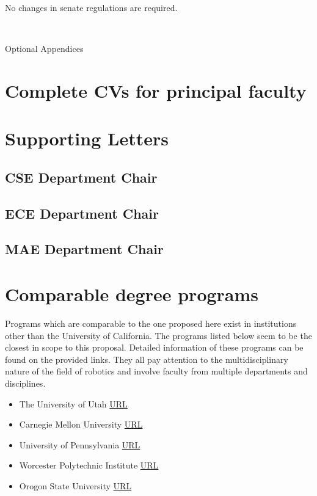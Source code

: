 \documentclass[11pt,letterpaper]{article}
\begin{document}
No changes in senate regulations are required.


\appendix
~
\newpage

\noindent Optional Appendices

\section{Complete CVs for principal faculty}

\newpage

\section{Supporting Letters}
\label{App:SupportingLetters}


\subsection{CSE Department Chair}

\subsection{ECE Department Chair}

\subsection{MAE Department Chair}

\newpage

\section{Comparable degree programs}
\label{App:Comparable}

Programs which are comparable to the one proposed here exist in
institutions other than the University of California. The programs
listed below seem to be the closest in scope to this
proposal. Detailed information of these programs can be found on the
provided links. They all pay attention to the multidisciplinary nature
of the field of robotics and involve faculty from multiple departments
and disciplines.

\begin{itemize}
\item The University of Utah \href{}{URL}
\item Carnegie Mellon University
  \href{https://www.ri.cmu.edu/education/academic-programs/master-of-science-robotics/}{URL}
\item University of Pennsylvania
  \href{https://gradadm.seas.upenn.edu/masters/robotics/}{URL}
\item Worcester Polytechnic Institute
  \href{https://www.wpi.edu/academics/study/robotics-engineering-ms}{URL}
\item Orogon State University \href{}{URL} 
\end{itemize}
\end{document}
